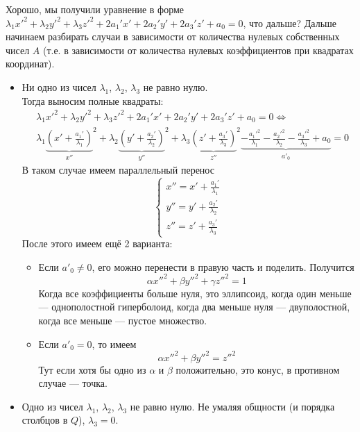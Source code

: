 \documentclass{article}
\begin{document}
\begin{itemize}
\begin{Comment}
            Хорошо, мы получили уравнение в форме $\lambda_1{x'}^2+\lambda_2{y'}^2+\lambda_3{z'}^2+2a_1'x'+2a_2'y'+2a_3'z'+a_0=0$, что дальше? Дальше начинаем разбирать случаи в зависимости от количества нулевых собственных чисел $A$ (т.е. в зависимости от количества нулевых коэффициентов при квадратах координат).
            \begin{itemize}
                \item Ни одно из чисел $\lambda_1$, $\lambda_2$, $\lambda_3$ не равно нулю.\\
                Тогда выносим полные квадраты:
                \[\begin{split}
                    &\lambda_1{x'}^2+\lambda_2{y'}^2+\lambda_3{z'}^2+2a_1'x'+2a_2'y'+2a_3'z'+a_0=0\Leftrightarrow\\
                    &\lambda_1{\underbrace{\left(x'+\frac{a_1'}{\lambda_1}\right)}_{x''}}^2+\lambda_2{\underbrace{\left(y'+\frac{a_2'}{\lambda_2}\right)}_{y''}}^2+\lambda_3{\underbrace{\left(z'+\frac{a_3'}{\lambda_3}\right)}_{z''}}^2\underbrace{-\frac{{a_1'}^2}{\lambda_1}-\frac{{a_2'}^2}{\lambda_2}-\frac{{a_3'}^2}{\lambda_3}+a_0}_{a'_0}=0
                \end{split}\]
                В таком случае имеем параллельный перенос
                $$
                \left\{\begin{aligned}
                    x''=x'+\frac{a_1'}{\lambda_1}\\
                    y''=y'+\frac{a_2'}{\lambda_2}\\
                    z''=z'+\frac{a_3'}{\lambda_3}
                \end{aligned}\right.
                $$
                После этого имеем ещё 2 варианта:
                \begin{itemize}
                    \item Если $a'_0\neq0$, его можно перенести в правую часть и поделить. Получится
                    $$\alpha{x''}^2+\beta{y''}^2+\gamma{z''}^2=1$$
                    Когда все коэффициенты больше нуля, это эллипсоид, когда один меньше --- однополостной гиперболоид, когда два меньше нуля --- двуполостной, когда все меньше --- пустое множество.
                    \item Если $a'_0=0$, то имеем
                    $$\alpha{x''}^2+\beta{y''}^2={z''}^2$$
                    Тут если хотя бы одно из $\alpha$ и $\beta$ положительно, это конус, в противном случае --- точка.
                \end{itemize}
                \item Одно из чисел $\lambda_1$, $\lambda_2$, $\lambda_3$ не равно нулю. Не умаляя общности (и порядка столбцов в $Q$), $\lambda_3=0$.\\

\end{itemize}
\end{Comment}
\end{itemize}
\end{document}
